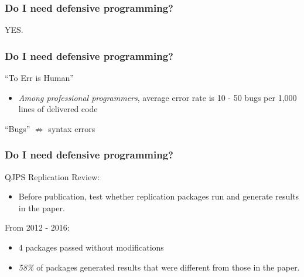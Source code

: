 \documentclass[11pt]{beamer}
\begin{document}
\begin{frame}\frametitle{Do I need defensive programming?}
\begin{center}
    \pause \LARGE \alert{YES.}
\end{center}
\end{frame}

\begin{frame}\frametitle{Do I need defensive programming?}
\begin{center}
    \alert{``To Err is Human''}
\end{center}
\begin{itemize}
    \pause \item \emph{Among professional programmers}, average error rate is 10 - 50 bugs per 1,000 lines of delivered code \\
    {\color{gray}{Steve McConnell, 1993}}
\end{itemize}
``Bugs'' $\nRightarrow$ syntax errors
\end{frame}

\begin{frame}\frametitle{Do I need defensive programming?}
QJPS Replication Review:
\begin{itemize}
    \item Before publication, test whether replication packages run and generate results in the paper.
\end{itemize}

\pause From 2012 - 2016:
\begin{itemize}
    \pause \item 4 packages passed without modifications
    \pause \item \alert{\emph{58\%}} of packages generated results that were different from those in the paper.
\end{itemize}
\end{frame}
\end{document}

